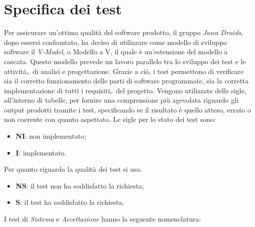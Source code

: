 \chapter{Specifica dei test} \label{SpecificaDeiTest}

Per assicurare un’ottima qualità del software prodotto, il gruppo \textit{Jawa Druids}, dopo essersi confrontato, ha deciso di utilizzare come modello di sviluppo software il \textit{V-Model}, o Modello a V, il quale è un’estensione del modello a cascata.
Questo modello prevede un lavoro parallelo tra lo sviluppo dei test e le attività$_{\scaleto{G}{3pt}}$ di analisi e progettazione.
Grazie a ciò, i test permettono di verificare sia il corretto funzionamento delle parti di software programmate, sia la corretta implementazione di tutti i requisiti$_{\scaleto{G}{3pt}}$ del progetto.
Vengono utilizzate delle sigle, all’interno di tabelle, per fornire una comprensione più agevolata riguardo gli output prodotti tramite i test, specificando se il risultato è quello atteso, errato o non coerente con quanto aspettato.
Le sigle per lo stato dei test sono:
\begin{itemize}
	\item \textbf{NI}: non implementato;
	\item \textbf{I}: implementato.
\end{itemize}
Per quanto riguarda la qualità dei test si usa:
\begin{itemize}
	\item \textbf{NS}: il test non ha soddisfatto la richiesta;
	\item \textbf{S}: il test ha soddisfatto la richiesta.
\end{itemize}

I test di \textit{Sistema} e \textit{Accettazione} hanno la seguente nomenclatura:

